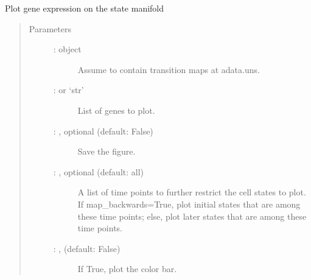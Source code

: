 \documentclass[letterpaper,10pt,english]{sphinxmanual}
\begin{document}
\begin{fulllineitems}
\label{\detokenize{cospar.pl.gene_expression_on_manifold:cospar.pl.gene_expression_on_manifold}}
Plot gene expression on the state manifold
\begin{quote}\begin{description}
\item[{Parameters}] \leavevmode\begin{description}
\item[{ :  object}] \leavevmode
Assume to contain transition maps at adata.uns.

\item[{ :  or ‘str’}] \leavevmode
List of genes to plot.

\item[{ : , optional (default: False)}] \leavevmode
Save the figure.

\item[{ : , optional (default: all)}] \leavevmode
A list of time points to further restrict the cell states to plot.
If map\_backwards=True, plot initial states that are among these time points;
else, plot later states that are among these time points.

\item[{ : , (default: False)}] \leavevmode
If True, plot the color bar.

\end{description}

\end{description}\end{quote}

\end{fulllineitems}
\end{document}
